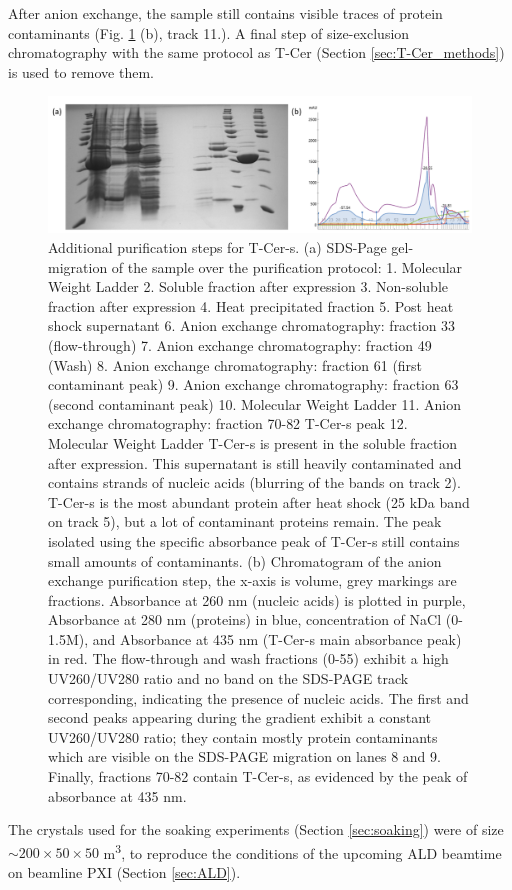 After anion exchange, the sample still contains visible traces of protein contaminants (Fig. \ref{fig:T-Cer-s_purif} (b), track 11.). A final step of size-exclusion chromatography with the same protocol as T-Cer (Section \ref{sec:T-Cer_methods}) is used to remove them.
\begin{figure}[H] %
    \centering
        \noindent \includegraphics[width=\textwidth]{images/T-Cer/T-Cer-s_purification.pdf}
    \hfill
    \caption{Additional purification steps for T-Cer-s. (a) SDS-Page gel-migration of the sample over the purification protocol:
    1. Molecular Weight Ladder
    2. Soluble fraction after expression 
    3. Non-soluble fraction after expression 
    4. Heat precipitated fraction 
    5. Post heat shock supernatant 
    6. Anion exchange chromatography: fraction 33 (flow-through)
    7.  Anion exchange chromatography: fraction 49 (Wash)
    8. Anion exchange chromatography: fraction 61 (first contaminant peak)
    9. Anion exchange chromatography: fraction 63 (second contaminant peak)
    10. Molecular Weight Ladder
    11. Anion exchange chromatography: fraction 70-82 T-Cer-s peak
    12.  Molecular Weight Ladder
T-Cer-s is present in the soluble fraction after expression. This supernatant is still heavily contaminated and contains strands of nucleic acids (blurring of the bands on track 2). T-Cer-s is the most abundant protein after heat shock (25 kDa band on track 5), but a lot of contaminant proteins remain. The peak isolated using the specific absorbance peak of T-Cer-s still contains small amounts of contaminants. 
    (b) Chromatogram of the anion exchange purification step, the x-axis is volume, grey markings are fractions. Absorbance at 260 nm (nucleic acids) is plotted in purple, Absorbance at 280 nm (proteins) in blue, concentration of NaCl (0-1.5M), and Absorbance at 435 nm (T-Cer-s main absorbance peak) in red. The flow-through and wash fractions (0-55) exhibit a high UV260/UV280 ratio and no band on the SDS-PAGE track corresponding, indicating the presence of nucleic acids. The first and second peaks appearing during the gradient exhibit a constant UV260/UV280 ratio; they contain mostly protein contaminants which are visible on the SDS-PAGE migration on lanes 8 and 9. Finally, fractions 70-82 contain T-Cer-s, as evidenced by the peak of absorbance at 435 nm.}\label{fig:T-Cer-s_purif}
\end{figure}
The crystals used for the soaking experiments (Section \ref{sec:soaking}) were of size \(\sim 200 \times 50 \times 50 \) \textmu m\textsuperscript{3}, to reproduce the conditions of the upcoming ALD beamtime on beamline PXI (Section \ref{sec:ALD}). 
